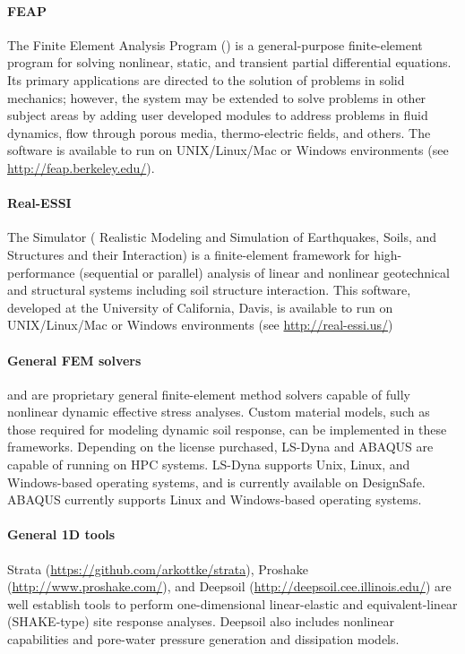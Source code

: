 \paragraph{FEAP} The Finite Element Analysis Program () is a general-purpose finite-element program for solving nonlinear, static, and transient partial differential equations. Its primary applications are directed to the solution of problems in solid mechanics; however, the system may be extended to solve problems in other subject areas by adding user developed modules to address problems in fluid dynamics, flow through porous media, thermo-electric fields, and others. The software is available to run on UNIX/Linux/Mac or Windows environments (see \url{http://feap.berkeley.edu/}).

\paragraph{Real-ESSI} The  Simulator ( Realistic Modeling and Simulation of Earthquakes, Soils, and Structures and their Interaction) is a finite-element framework for high-performance (sequential or parallel) analysis of linear and nonlinear geotechnical and structural systems including soil structure interaction. This software, developed at the University of California, Davis, is available to run on UNIX/Linux/Mac or Windows environments (see \url{http://real-essi.us/})

\paragraph{General FEM solvers}
 and  are  proprietary general finite-element method solvers capable of fully nonlinear dynamic effective stress analyses. Custom material models, such as those required for modeling dynamic soil response, can be implemented in these frameworks. Depending on the license purchased, LS-Dyna and ABAQUS are capable of running on HPC systems. LS-Dyna supports Unix, Linux, and Windows-based operating systems, and is currently available on DesignSafe. ABAQUS currently supports Linux and Windows-based operating systems.

\paragraph{General 1D tools}
Strata (\url{https://github.com/arkottke/strata}), Proshake (\url{http://www.proshake.com/}), and Deepsoil (\url{http://deepsoil.cee.illinois.edu/}) are well establish tools to perform one-dimensional linear-elastic and equivalent-linear (SHAKE-type) site response analyses. Deepsoil also includes nonlinear capabilities and pore-water pressure generation and dissipation models.

